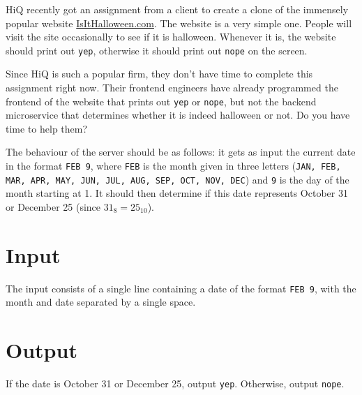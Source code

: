 
\noindent
HiQ recently got an assignment from a client to create a clone of the immensely popular website \url{IsItHalloween.com}.
The website is a very simple one.
People will visit the site occasionally to see if it is halloween.
Whenever it is, the website should print out \texttt{yep}, otherwise it should print out \texttt{nope} on the screen.

Since HiQ is such a popular firm, they don't have time to complete this assignment right now.
Their frontend engineers have already programmed the frontend of the website that prints out \texttt{yep} or \texttt{nope}, but not the backend microservice that determines whether it is indeed halloween or not.
Do you have time to help them?

The behaviour of the server should be as follows: it gets as input the current date in the format \texttt{FEB 9}, where \texttt{FEB} is the month given in three letters (\texttt{JAN, FEB, MAR, APR, MAY, JUN, JUL, AUG, SEP, OCT, NOV, DEC}) and \texttt{9} is the day of the month starting at 1.
It should then determine if this date represents October 31 or December 25 (since $31_8 = 25_{10}$).

\section*{Input}
The input consists of a single line containing a date of the format \texttt{FEB 9}, with the month and date separated by a single space.

\section*{Output}
If the date is October 31 or December 25, output \texttt{yep}.
Otherwise, output \texttt{nope}.
